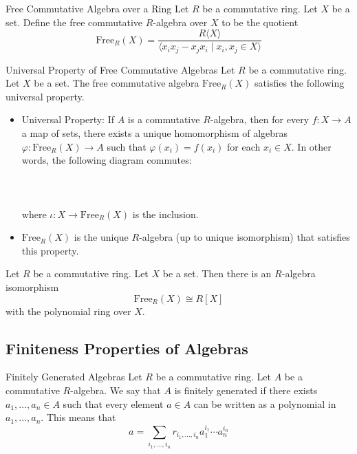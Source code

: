 \documentclass[a4paper]{article}
\begin{document}
\begin{defn}{Free Commutative Algebra over a Ring}{} Let $R$ be a commutative ring. Let $X$ be a set. Define the free commutative $R$-algebra over $X$ to be the quotient $$\text{Free}_R(X)=\frac{R\langle X\rangle}{\langle x_ix_j-x_jx_i\;|\;x_i,x_j\in X\rangle}$$
\end{defn}

\begin{prp}{Universal Property of Free Commutative Algebras}{} Let $R$ be a commutative ring. Let $X$ be a set. The free commutative algebra $\text{Free}_R(X)$ satisfies the following universal property. 
\begin{itemize}
\item Universal Property: If $A$ is a commutative $R$-algebra, then for every $f:X\to A$ a map of sets, there exists a unique homomorphism of algebras $\varphi:\text{Free}_R(X)\to A$ such that $\varphi(x_i)=f(x_i)$ for each $x_i\in X$. In other words, the following diagram commutes: \\~\\
\\~\\
where $\iota:X\to\text{Free}_R(X)$ is the inclusion. 
\item $\text{Free}_R(X)$ is the unique $R$-algebra (up to unique isomorphism) that satisfies this property. 
\end{itemize}
\end{prp}

\begin{prp}{}{} Let $R$ be a commutative ring. Let $X$ be a set. Then there is an $R$-algebra isomorphism $$\text{Free}_R(X)\cong R[X]$$ with the polynomial ring over $X$. 
\end{prp}

\subsection{Finiteness Properties of Algebras}
\begin{defn}{Finitely Generated Algebras}{} Let $R$ be a commutative ring. Let $A$ be a commutative $R$-algebra. We say that $A$ is finitely generated if there exists $a_1,\dots,a_n\in A$ such that every element $a\in A$ can be written as a polynomial in $a_1,\dots,a_n$. This means that $$a=\sum_{i_1,\dots,i_n}r_{i_1,\dots,i_n}a_1^{i_1}\cdots a_n^{i_n}$$
\end{defn}
\end{document}
